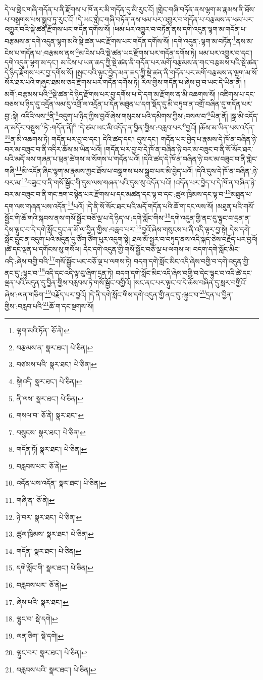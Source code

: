དེ་ལ་གླེང་གཞི་གདོན་པ་ནི་རྫོགས་པ་ཁོ་ནར་མི་གདོན་དུ་མི་རུང་ངོ། །གླེང་གཞི་བཏོན་ནས་ལྷག་མ་རྣམས་ནི་ཐོས་པ་བསྒྲགས་པས་སྒྲུབ་ཏུ་རུང་ངོ། །དེ་ཡང་གླེང་གཞི་བཏོན་ནས་ཕམ་པར་འགྱུར་བ་གདོན་པ་བརྩམས་ན་ཕམ་པར་འགྱུར་བའི་སྡེ་ཚན་རྫོགས་པར་གདོན་དགོས་སོ། །ཕམ་པར་འགྱུར་བ་བཏོན་ནས་དགེ་འདུན་ལྷག་མ་གདོན་པ་བརྩམས་ན་དགེ་འདུན་ལྷག་མའི་སྡེ་ཚན་ཡང་རྫོགས་པར་གདོན་དགོས་སོ། །དགེ་འདུན་:ལྷག་མ་བཏོན་\footnote{ལྷག་མའི་ཏོན་  ཅོ་ནེ། }ནས་མ་ངེས་པ་གདོན་པ་:བརྩམས་ནས་\footnote{བརྩམས་ན་  སྣར་ཐང་།  པེ་ཅིན། }མ་ངེས་པའི་སྡེ་ཚན་ཡང་རྫོགས་པར་གདོན་དགོས་ཏེ། ཕམ་པར་འགྱུར་བ་དང་། དགེ་འདུན་ལྷག་མ་དང་། མ་ངེས་པ་ཡན་ཆད་ཀྱི་སྡེ་ཚན་ནི་གདོན་པར་མགོ་བརྩམས་ན་གང་བརྩམས་པའི་སྡེ་ཚན་དེ་ཉིད་རྫོགས་པར་བྱ་དགོས་སོ། །སྤང་བའི་ལྟུང་བྱེད་མན་ཆད་ཀྱི་སྡེ་ཚན་ནི་གདོན་པར་མགོ་བརྩམས་ན་ལྷག་མ་སོ་སོར་ཐར་པའི་གཞུང་ཐམས་ཅད་རྫོགས་པར་གདོན་དགོས་ཏེ། རིལ་གྱིས་གདོན་པ་ཞེས་བྱ་བ་ཡང་དེ་ཡིན་ནོ། །མགོ་:བརྩམས་པའི་\footnote{བཙམས་པའི་  སྣར་ཐང་།  པེ་ཅིན། }སྡེ་ཚན་དེ་ཉིད་རྫོགས་པར་བྱ་དགོས་པ་དེ་དག་མ་རྫོགས་ན་མི་འཆགས་སོ། །འཇིགས་པ་དང་བཅས་པ་ཉིད་དུ་འདྲོན་ལམ་དུ་འགྲོ་ལ་འདྲོན་པ་དོན་མཐུན་པ་དག་སྡོད་དུ་མི་བཏུབ་ན་འགྲོ་བཞིན་དུ་གདོན་པར་བྱ་:སྟེ། འདིའི་ལས་\footnote{སྟེ།འདི་  སྣར་ཐང་།  པེ་ཅིན། }ནི་\footnote{ནི་ལས་  སྣར་ཐང་།  པེ་ཅིན། }འདུག་པ་ཉིད་ཀྱིས་བྱའོ་ཞེས་གསུངས་པའི་དམིགས་ཀྱིས་:བསལ་བ་\footnote{གསལ་བ་  ཅོ་ནེ།  སྣར་ཐང་། }ཡིན་ནོ། །སྒྲ་མི་འདོད་ན་མདོར་བསྡུས་\footnote{བསྲུངས་  སྣར་ཐང་།  པེ་ཅིན། }ཏེ་:གདོན་ནོ།\footnote{གདོན་ཏོ།  སྣར་ཐང་།  པེ་ཅིན། } །དེ་ཙམ་ཡང་མི་འདོད་ན་བྱིན་གྱིས་:བརླབ་པར་\footnote{བརླབས་པར་  ཅོ་ནེ། }བྱའོ། །ཆོས་མ་ཡིན་པས་འདོན་\footnote{འདོན་པས་འདོན་  སྣར་ཐང་།  པེ་ཅིན། }ན་མི་འཆགས་ཏེ། གདོན་པར་བྱ་བ་དང་། དེའི་ཚད་དང་། དུས་དང་། གདོན་པར་བྱེད་པ་རྣམས་དེ་ཁོ་ན་བཞིན་ཉེ་བར་མ་བཟུང་བ་ནི་འདིར་ཆོས་མ་ཡིན་པའོ། །གདོན་པར་བྱ་བ་དེ་ཁོ་ན་བཞིན་ཉེ་བར་མ་བཟུང་བ་ནི་སོ་སོར་ཐར་པའི་མདོ་ལས་གཞན་པ་ཕྲན་ཚེགས་ལ་སོགས་པ་གདོན་པའོ། །དེའི་ཚད་དེ་ཁོ་ན་བཞིན་ཉེ་བར་མ་བཟུང་བ་ནི་གླེང་གཞི་\footnote{གཞི་ན་  ཅོ་ནེ། }མི་འདོན་ཞིང་ལྷག་མ་རྣམས་ཀྱང་ཐོས་པ་བསྒྲགས་པས་སྒྲུབ་པར་མི་བྱེད་པའོ། །དེའི་དུས་དེ་ཁོ་ན་བཞིན་:ཉེ་བར་མ་\footnote{ཉེ་བར་  སྣར་ཐང་།  པེ་ཅིན། }བཟུང་བ་ནི་གསོ་སྦྱོང་གི་དུས་ལས་གཞན་པའི་དུས་སུ་འདོན་པའོ། །འདོན་པར་བྱེད་པ་དེ་ཁོ་ན་བཞིན་ཉེ་བར་མ་བཟུང་བ་ནི་གང་ཟག་བསྙེན་པར་རྫོགས་པ་དང་མཚན་དང་ལྟ་བ་དང་:ཚུལ་ཁྲིམས་དང་ལྟ་བ་\footnote{ཚུལ་ཁྲིམས་  སྣར་ཐང་།  པེ་ཅིན། }མཐུན་པ་དག་ལས་གཞན་པས་འདོན་\footnote{གདོན་  སྣར་ཐང་།  པེ་ཅིན། }པའོ། །དེ་ནི་སོ་སོར་ཐར་པའི་མདོ་གདོན་པའི་ཆོ་ག་དང་ལས་སོ། །མཐུན་པའི་གསོ་སྦྱོང་གི་ཆོ་གའི་སྐབས་ནས་གསོ་སྦྱོང་བཅོ་ལྔ་པ་དེ་ཉིད་ལ་:དགེ་སློང་གིས་\footnote{དགེ་སློང་གི་  སྣར་ཐང་།  པེ་ཅིན། }དགེ་འདུན་གྱི་ནང་དུ་ལྟུང་བ་དྲན་ན་དེས་ལྟུང་བ་དེ་དགེ་སློང་དྲུང་ན་མོ་ལ་བྱིན་གྱིས་:བརླབ་པར་\footnote{བརླབས་པར་  ཅོ་ནེ། }བྱའོ་ཞེས་གསུངས་པ་ནི་འདི་ལྟར་བྱ་སྟེ། དེས་དགེ་སློང་དྲུང་ན་འདུག་པའི་མདུན་དུ་ཙོག་ཙོག་པུར་འདུག་སྟེ། ཐལ་མོ་སྦྱར་བ་བཏུད་ནས་འདི་སྐད་ཅེས་བརྗོད་པར་བྱའོ། །ཚེ་དང་ལྡན་པ་དགོངས་སུ་གསོལ། དེང་དགེ་འདུན་གྱི་གསོ་སྦྱོང་བཅོ་ལྔ་པ་ལགས་ལ། བདག་དགེ་སློང་མིང་འདི་:ཞེས་བགྱི་བའི་\footnote{ཞེས་པའི་  སྣར་ཐང་། }གསོ་སྦྱོང་ཡང་བཅོ་ལྔ་པ་ལགས་ཏེ། བདག་དགེ་སློང་མིང་འདི་ཞེས་བགྱི་བ་དགེ་འདུན་གྱི་ནང་དུ་:ལྟུང་བ་\footnote{ལྷུང་བ་  སྡེ་དགེ། }འདི་དང་འདི་ལྟ་བུ་ཞིག་དྲན་ཏེ། བདག་དགེ་སློང་མིང་འདི་ཞེས་བགྱི་བ་དེང་ལྟུང་བ་འདི་ཚེ་དང་ལྡན་པའི་མདུན་དུ་བྱིན་གྱིས་བརླབས་ཏེ་གསོ་སྦྱོང་བགྱིའོ། །སང་ནང་པར་ལྟུང་བ་དེ་ཆོས་བཞིན་དུ་སླར་བགྱིའོ་ཞེས་:ལན་གཅིག་\footnote{ལན་ཅིག་  སྡེ་དགེ། }བརྗོད་པར་བྱའོ། །དེ་ནི་དགེ་སློང་གིས་དགེ་འདུན་གྱི་ནང་དུ་:ལྟུང་བ་\footnote{ལྟུང་བར་  སྣར་ཐང་།  པེ་ཅིན། }དྲན་པ་བྱིན་གྱིས་:བརླབ་པའི་\footnote{བརླབས་པའི་  སྣར་ཐང་།  པེ་ཅིན། }ཆོ་ག་དང་སྔགས་སོ། 